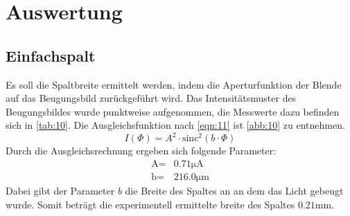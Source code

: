 \section{Auswertung}
\subsection{Einfachspalt}
Es soll die Spaltbreite ermittelt werden, indem die Aperturfunktion der Blende
auf das Beugungsbild zurückgeführt wird. Das Intensitätsmuster des Beugungsbildes
wurde punktweise aufgenommen, die Messwerte dazu befinden sich in \autoref{tab:10}.
Die Ausgleichsfunktion nach \autoref{eqn:11} ist \autoref{abb:10} zu entnehmen.
\begin{equation}
    \label{eqn:11}
    I\left(\Phi\right) = A^2 \cdot \text{sinc}^2\left(b \cdot \Phi\right) 
\end{equation}
\noindent Durch die Ausgleichsrechnung ergeben sich folgende Parameter:
\begin{align}
    \text{A} = & 0.71 \unit{\micro\ampere} \\
    \text{b} = & 216.0 \unit{\micro\meter}
\end{align}
Dabei gibt der Parameter $b$ die Breite des Spaltes an an dem das Licht gebeugt
wurde. Somit beträgt die experimentell ermittelte breite des Spaltes 
$0.21 \unit{\milli\meter}$.
